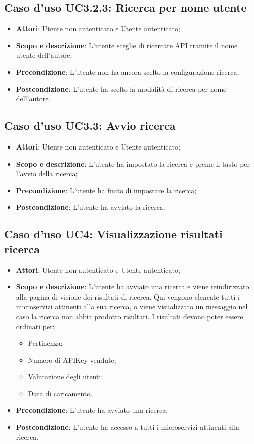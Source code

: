 \documentclass[12pt,a4paper,titlepage]{article}
\begin{document}
	\subsection{Caso d'uso UC3.2.3: Ricerca per nome utente}
	\label{UC3.2.3}
	\begin{itemize}
		\item \textbf{Attori}: Utente non autenticato e Utente autenticato;
		\item \textbf{Scopo e descrizione}: L'utente sceglie di ricercare API tramite il nome utente dell'autore;
		\item \textbf{Precondizione}: L'utente non ha ancora scelto la configurazione ricerca;
		\item \textbf{Postcondizione}: L'utente ha scelto la modalità di ricerca per nome dell'autore.
	\end{itemize}
	\subsection{Caso d'uso UC3.3: Avvio ricerca}
	\label{UC3.3}
	\begin{itemize}
		\item \textbf{Attori}: Utente non autenticato e Utente autenticato;
		\item \textbf{Scopo e descrizione}: L'utente ha impostato la ricerca e preme il tasto per l'avvio della ricerca;
		\item \textbf{Precondizione}: L'utente ha finito di impostare la ricerca;
		\item \textbf{Postcondizione}: L'utente ha avviato la ricerca.
	\end{itemize}


	\subsection{Caso d'uso UC4: Visualizzazione risultati ricerca}
	\label{UC4}
	\begin{itemize}
		\item \textbf{Attori}: Utente non autenticato e Utente autenticato;
		\item \textbf{Scopo e descrizione}: L'utente ha avviato una ricerca e viene reindirizzato alla pagina di visione dei risultati di ricerca. Qui vengono elencate tutti i microservizi attinenti alla sua ricerca, o viene visualizzato un messaggio nel caso la ricerca non abbia prodotto risultati. I risultati devono poter essere ordinati per:
		\begin{itemize}
			\item Pertinenza;
			\item Numero di APIKey vendute;
			\item Valutazione degli utenti;
			\item Data di caricamento.
		\end{itemize}
		\item \textbf{Precondizione}: L'utente ha avviato una ricerca;
		\item \textbf{Postcondizione}: L'utente ha accesso a tutti i microservizi attinenti alla ricerca.
	\end{itemize}
\end{document}
